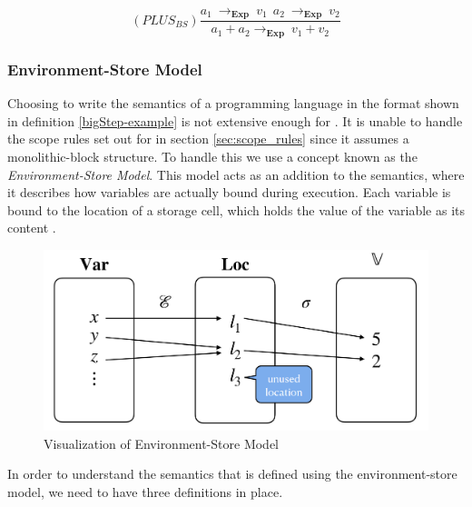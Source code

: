 \begin{equation} \label{bigStep-example}
    (PLUS_{BS})\frac{a_1 \ \rightarrow _{\textbf{Exp}} \ v_1 \ \ a_2 \ \rightarrow _{\textbf{Exp}} \ v_2}
    {a_1  +  a_2 \rightarrow _{\textbf{Exp}} \ v_1  +  v_2}
\end{equation}

\subsubsection{Environment-Store Model}
Choosing to write the semantics of a programming language in the format shown in definition \ref{bigStep-example} is not extensive enough for \lang. It is unable to handle the scope rules set out for \lang in section \ref{sec:scope_rules} since it assumes a monolithic-block structure. To handle this we use a concept known as the \textit{Environment-Store Model}. This model acts as an addition to the semantics, where it describes how variables are actually bound during execution. Each variable is bound to the location of a storage cell, which holds the value of the variable as its content \cite{SS_lecture_12}.

\begin{figure}[H]
    \centering
    \includegraphics[width=\textwidth]{Files/Billeder: Design/ENVMODEL.png}
    \caption{Visualization of Environment-Store Model \cite{SS_lecture_12}}
    \label{fig:EnvModel}
\end{figure}

\noindent In order to understand the semantics that is defined using the environment-store model, we need to have three definitions in place.

